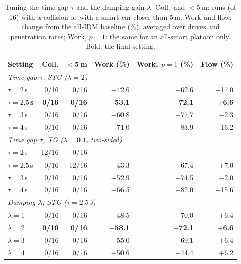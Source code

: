 \begin{table}[htbp]
\centering
\small
\caption{Tuning the time gap $\tau$ and the damping gain $\lambda$. Coll.\ and $<$5\,m: runs (of 16) with a collision or with a smart car closer than 5\,m. Work and flow: change from the all-IDM baseline (\%), averaged over drives and penetration rates; Work, $p=1$: the same for an all-smart platoon only. Bold: the final setting.}
\label{tab:tuning}
\begin{tabular}{lrrrrr}
\toprule
Setting & Coll. & $<$5\,m & Work (\%) & Work, $p=1$ (\%) & Flow (\%) \\
\midrule
\multicolumn{6}{l}{\emph{Time gap $\tau$, STG ($\lambda=2$)}} \\
$\tau=2$\,s & 0/16 & 0/16 & $-$42.6 & $-$62.6 & $+$17.0 \\
\textbf{$\tau=2.5$\,s} & \textbf{0/16} & \textbf{0/16} & \textbf{$-$53.1} & \textbf{$-$72.1} & \textbf{$+$6.6} \\
$\tau=3$\,s & 0/16 & 0/16 & $-$60.8 & $-$77.7 & $-$2.3 \\
$\tau=4$\,s & 0/16 & 0/16 & $-$71.0 & $-$83.9 & $-$16.2 \\
\midrule
\multicolumn{6}{l}{\emph{Time gap $\tau$, TG ($\lambda=0.1$, two-sided)}} \\
$\tau=2$\,s & 12/16 & 0/16 & -- & -- & -- \\
$\tau=2.5$\,s & 0/16 & 12/16 & $-$43.3 & $-$67.4 & $+$7.0 \\
$\tau=3$\,s & 0/16 & 0/16 & $-$52.9 & $-$74.5 & $-$2.0 \\
$\tau=4$\,s & 0/16 & 0/16 & $-$66.5 & $-$82.0 & $-$15.6 \\
\midrule
\multicolumn{6}{l}{\emph{Damping $\lambda$, STG ($\tau=2.5$\,s)}} \\
$\lambda=1$ & 0/16 & 0/16 & $-$48.5 & $-$70.0 & $+$6.4 \\
\textbf{$\lambda=2$} & \textbf{0/16} & \textbf{0/16} & \textbf{$-$53.1} & \textbf{$-$72.1} & \textbf{$+$6.6} \\
$\lambda=3$ & 0/16 & 0/16 & $-$55.0 & $-$69.1 & $+$6.4 \\
$\lambda=4$ & 0/16 & 0/16 & $-$50.6 & $-$44.4 & $+$6.2 \\
\bottomrule
\end{tabular}
\end{table}
